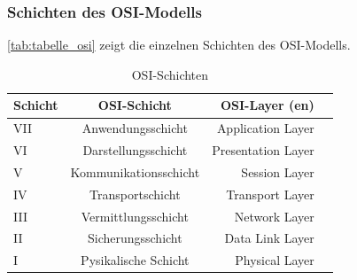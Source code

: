 \subsubsection{Schichten des \ac{OSI}-Modells} 
\autoref{tab:tabelle_osi} zeigt die einzelnen Schichten des \ac{OSI}-Modells.
\begin{table}[h!]
	\centering
	\begin{tabular}{p{3cm}crl}
		\textbf{Schicht} & \textbf{\ac{OSI}-Schicht} &\textbf{\ac{OSI}-Layer (en)} \\\toprule
		VII &  Anwendungsschicht & Application Layer\\
		VI &  Darstellungsschicht & Presentation Layer\\
		V &  Kommunikationsschicht & Session Layer\\
		IV &  Transportschicht & Transport Layer\\
		III &  Vermittlungsschicht & Network Layer\\
		II &  Sicherungsschicht & Data Link Layer\\
		I &  Pysikalische Schicht & Physical Layer\\\bottomrule
	\end{tabular}
	\caption[\ac{OSI}-Schichten]{\label{tab:tabelle_osi}\ac{OSI}-Schichten}
\end{table}

